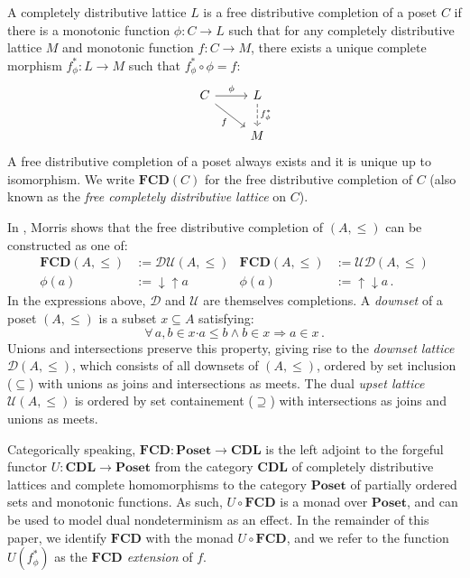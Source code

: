 \documentclass[format=sigplan,authordraft]{acmart}
\newcommand{\bdot}{\boldsymbol{\cdot}}
\begin{document}
A completely distributive lattice $L$ is a
free distributive completion of
a poset $C$ if there is
a monotonic function $\phi : C \rightarrow L$
such that
for any completely distributive lattice $M$
and monotonic function $f : C \rightarrow M$,
there exists a unique complete morphism $f^*_\phi : L \rightarrow M$
such that $f^*_\phi \circ \phi = f$:
\[
  \begin{tikzcd}
    C \arrow[r, "\phi"] \arrow[rd, "f"'] &
    L \arrow[d, "f^*_\phi", dashed] \\ & M
  \end{tikzcd}
\]
A free distributive completion of a poset
always exists and it is unique up to isomorphism.
We write $\mathbf{FCD}(C)$ for
the free distributive completion of $C$
(also known as the \emph{free completely distributive lattice} on $C$).

In \cite{augtyp}, Morris shows that
the free distributive completion of $(A, \le)$
can be constructed as one of:
\begin{align*}
  \mathbf{FCD}(A, {\le}) &:= \mathcal{D} \mathcal{U}(A, {\le}) &
  \mathbf{FCD}(A, {\le}) &:= \mathcal{U} \mathcal{D}(A, {\le}) \\
  \phi(a) &:= {\downarrow}{\uparrow} a &
  \phi(a) &:= {\uparrow}{\downarrow} a \,.
\end{align*}
In the expressions above,
$\mathcal{D}$ and $\mathcal{U}$
are themselves completions.
A \emph{downset} of a poset $(A, {\le})$
is a subset $x \subseteq A$ satisfying:
\[
  \forall \, a, b \in x \bdot
          a \le b \wedge b \in x \Rightarrow a \in x \,.
\]
Unions and intersections preserve this property,
giving rise to the \emph{downset lattice} $\mathcal{D}(A, {\le})$,
which consists of all downsets of $(A, {\le})$,
ordered by set inclusion (${\subseteq}$) with
unions as joins and intersections as meets.
The dual \emph{upset lattice} $\mathcal{U}(A, {\le})$
is ordered by set containement (${\supseteq}$) with
intersections as joins and unions as meets.

Categorically speaking,
$\mathbf{FCD} : \mathbf{Poset} \rightarrow \mathbf{CDL}$
is the left adjoint to the forgeful functor
$U : \mathbf{CDL} \rightarrow \mathbf{Poset}$
from the category $\mathbf{CDL}$
of completely distributive lattices and complete homomorphisms
to the category $\mathbf{Poset}$
of partially ordered sets and monotonic functions.
As such, $U \! \circ \mathbf{FCD}$ is a monad over $\mathbf{Poset}$,
and can be used to model dual nondeterminism
as an effect.
In the remainder of this paper,
we identify $\mathbf{FCD}$ with
the monad $U \! \circ \mathbf{FCD}$,
and we refer to the function
$U(f_\phi^*)$ as the \emph{$\mathbf{FCD}$ extension} of $f$.
\end{document}
